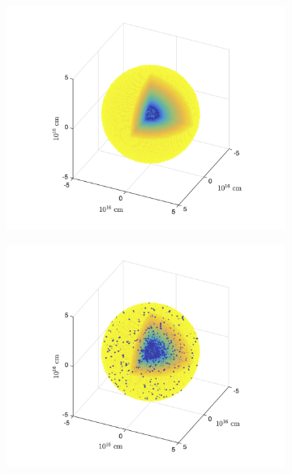 
\begin{figure}
\begin{subfigure}{0.4\textwidth}
\includegraphics[scale=0.5, trim=35mm 5mm 34mm 5mm,clip=true]{chapters/chapter2/smooth_grid.png}
\end{subfigure}
\hspace{18mm}
\begin{subfigure}{0.4\textwidth}
\includegraphics[scale=0.5, trim=35mm 5mm 34mm 5mm,clip=true]{chapters/chapter2/clumped_grid.png}

\end{subfigure}
\end{figure}
